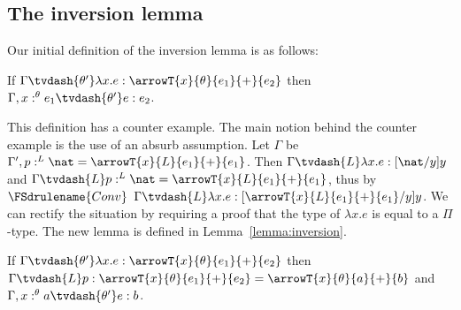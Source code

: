 \subsection{The inversion lemma}
\label{subsec:the_inversion_lemma}
Our initial definition of the inversion lemma is as follows:
\ \\
\begin{lemma}[]
  \label{lemma:orig_inversion}
  If $\Gamma \tvdash{\theta'} \lambda x.e:\arrowT{x}{\theta}{e_1}{+}{e_2}$ then
  $\Gamma,x:^\theta e_1 \tvdash{\theta'} e:e_2$.
\end{lemma}
This definition has a counter example.  The main notion behind the counter example is the use of 
an absurb assumption.  Let $\Gamma$ be $\Gamma', p:^L \nat = \arrowT{x}{L}{e_1}{+}{e_1}$.  Then
$\Gamma \tvdash{L} \lambda x.e:[\nat/y]y$ and 
$\Gamma \tvdash{L} p:^L \nat = \arrowT{x}{L}{e_1}{+}{e_1}$, thus by $\FSdrulename{Conv}$
$\Gamma \tvdash{L} \lambda x.e:[\arrowT{x}{L}{e_1}{+}{e_1}/y]y$.  We can rectify the situation by
requiring a proof that the type of $\lambda x.e$ is equal to a $\Pi$-type.  The new lemma is 
defined in Lemma~\ref{lemma:inversion}.
\ \\
\begin{lemma}[Inversion]
  \label{lemma:inversion}
  If $\Gamma \tvdash{\theta'} \lambda x.e:\arrowT{x}{\theta}{e_1}{+}{e_2}$ 
  then 
  $\Gamma \tvdash{L} p:\arrowT{x}{\theta}{e_1}{+}{e_2} = \arrowT{x}{\theta}{a}{+}{b}$
  and
  $\Gamma,x:^\theta a \tvdash{\theta'} e:b$.
\end{lemma}
